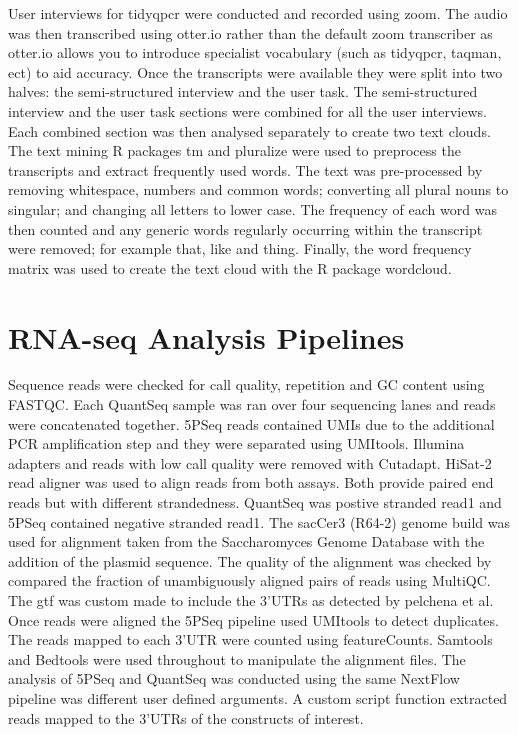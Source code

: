 \documentclass{SBCbookchapter}
\begin{document}
User interviews for tidyqpcr were conducted and recorded using zoom. The audio was then transcribed using otter.io rather than the default zoom transcriber as otter.io allows you to introduce specialist vocabulary (such as tidyqpcr, taqman, ect) to aid accuracy. Once the transcripts were available they were split into two halves: the semi-structured interview and the user task. The semi-structured interview and the user task sections were combined for all the user interviews. Each combined section was then analysed separately to create two text clouds.  The text mining R packages tm and pluralize were used to preprocess the transcripts and extract frequently used words. The text was pre-processed by removing whitespace, numbers and common words; converting all plural nouns to singular; and changing all letters to lower case. The frequency of each word was then counted and any generic words  regularly occurring within the transcript were removed; for example that, like and thing. Finally, the word frequency matrix was used to create the text cloud with the R package wordcloud.

\section{RNA-seq Analysis Pipelines}

Sequence reads were checked for call quality, repetition and GC content using FASTQC. Each QuantSeq sample was ran over four sequencing lanes and reads were concatenated together. 5PSeq reads contained UMIs due to the additional PCR amplification step and they were separated using UMItools. Illumina adapters and reads with low call quality were removed with Cutadapt. HiSat-2 read aligner was used to align reads from both assays. Both provide paired end reads but with different strandedness. QuantSeq was postive stranded read1 and 5PSeq contained negative stranded read1. The sacCer3 (R64-2) genome build was used for alignment taken from the Saccharomyces Genome Database with the addition of the plasmid sequence. The quality of the alignment was checked by compared the fraction of unambiguously aligned pairs of reads using MultiQC. The gtf was custom made to include the 3'UTRs as detected by pelchena et al. Once reads were aligned the 5PSeq pipeline used UMItools to detect duplicates. The reads mapped to each 3'UTR were counted using featureCounts. Samtools and Bedtools were used throughout to manipulate the alignment files. The analysis of 5PSeq and QuantSeq was conducted using the same NextFlow pipeline was different user defined arguments. A custom script function extracted reads mapped to the 3'UTRs of the constructs of interest.
\end{document}
